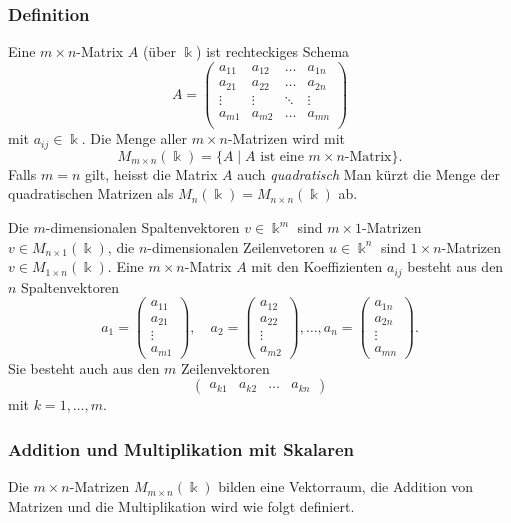 \subsubsection{Definition}
\begin{definition}
Eine $m\times n$-Matrix $A$ (über $\Bbbk$) ist rechteckiges Schema
%
\[
A
=
\begin{pmatrix}
a_{11}&a_{12}&\dots &a_{1n}\\
a_{21}&a_{22}&\dots &a_{2n}\\
\vdots&\vdots&\ddots&\vdots\\
a_{m1}&a_{m2}&\dots &a_{mn}\\
\end{pmatrix}
\]
mit $a_{ij}\in\Bbbk$.
Die Menge aller $m\times n$-Matrizen wird mit
\[
M_{m\times n}(\Bbbk) = \{ A\;|\; \text{$A$ ist eine $m\times n$-Matrix}\}.
\]
Falls $m=n$ gilt, heisst die Matrix $A$ auch {\em quadratisch}
%
Man kürzt die Menge der quadratischen Matrizen als 
$M_n(\Bbbk) = M_{n\times n}(\Bbbk)$ ab.
\end{definition}

Die $m$-dimensionalen Spaltenvektoren $v\in \Bbbk^m$ sind $m\times 1$-Matrizen 
$v\in M_{n\times 1}(\Bbbk)$, die $n$-dimensionalen Zeilenvetoren $u\in\Bbbk^n$
sind $1\times n$-Matrizen $v\in M_{1\times n}(\Bbbk)$.
Eine $m\times n$-Matrix $A$ mit den Koeffizienten $a_{ij}$ besteht aus 
den $n$ Spaltenvektoren
\[
a_1 = \begin{pmatrix} a_{11} \\ a_{21} \\ \vdots \\ a_{m1} \end{pmatrix},\quad
a_2 = \begin{pmatrix} a_{12} \\ a_{22} \\ \vdots \\ a_{m2} \end{pmatrix},\dots,
a_n = \begin{pmatrix} a_{1n} \\ a_{2n} \\ \vdots \\ a_{mn} \end{pmatrix}.
\]
Sie besteht auch aus den $m$ Zeilenvektoren
\[
\begin{pmatrix} a_{k1} & a_{k2} & \dots & a_{kn} \end{pmatrix}
\]
mit $k=1,\dots,m$.

\subsubsection{Addition und Multiplikation mit Skalaren}
Die $m\times n$-Matrizen $M_{m\times n}(\Bbbk)$ bilden eine Vektorraum,
die Addition von Matrizen und die Multiplikation wird wie folgt definiert.

